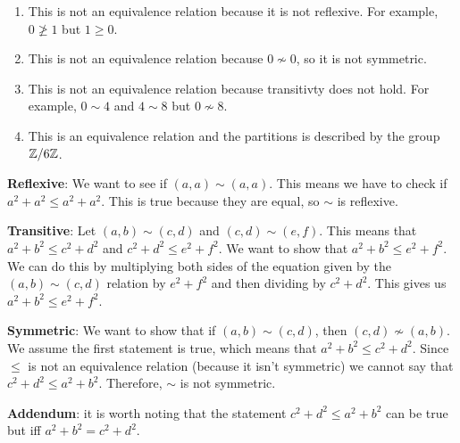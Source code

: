 \documentclass{report}
\begin{document}
\sol

\begin{enumerate}[label=\alph*.]
    \item This is not an equivalence relation because it is not reflexive. For example, $0 \not \geq 1$ but $1 \geq 0$.
    \item This is not an equivalence relation because $0 \not \sim 0$, so it is not symmetric.
    \item This is not an equivalence relation because transitivty does not hold. For example, $0 \sim 4$ and $4 \sim 8$ but $0 \not \sim 8$.
    \item This is an equivalence relation and the partitions is described by the group $\ZZ / 6\ZZ$.
\end{enumerate}

\sol

\textbf{Reflexive}: We want to see if $(a, a) \sim (a, a)$. This means we have to check if $a^2 + a^2 \leq a^2 + a^2$. This is true because they are equal, so $\sim$ is reflexive.

\textbf{Transitive}: Let $(a, b) \sim (c, d)$ and $(c, d) \sim (e, f)$. This means that $a^2 + b^2 \leq c^2 + d^2$ and $c^2 + d^2 \leq e^2 + f^2$. We want to show that $a^2 + b^2 \leq e^2 + f^2$. We can do this by multiplying both sides of the equation given by the $(a, b) \sim (c, d)$ relation by $e^2 + f^2$ and then dividing by $c^2 + d^2$. This gives us $a^2 + b^2 \leq e^2 + f^2$.

\textbf{Symmetric}: We want to show that if $(a, b) \sim (c, d)$, then $(c, d) \not\sim (a, b)$. We assume the first statement is true, which means that $a^2 + b^2 \leq c^2 + d^2$. Since $\leq$ is not an equivalence relation (because it isn't symmetric) we cannot say that $c^2 + d^2 \leq a^2 + b^2$. Therefore, $\sim$ is not symmetric.

\textbf{Addendum}: it is worth noting that the statement $c^2 + d^2 \leq a^2 + b^2$ can be true but iff $a^2 + b^2 = c^2 + d^2$.
\end{document}
